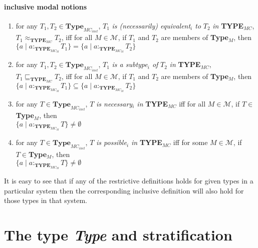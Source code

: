\paragraph{inclusive modal notions}
\begin{enumerate} 
 
\item for any $T_1,T_2\in\textbf{Type}_{\mathit{MC}_{\mathit{incl}}}$, $T_1$ \textit{is
    (necessarily) equivalent$_i$
    to} $T_2$ \textit{in} {\bf TYPE$_{\mathit{MC}}$},
  $T_1\approx_{\mathbf{TYPE_{\mathit{MC}}}}T_2$,  iff for all
  $M\in\mathcal{M}$, if $T_1$ and $T_2$ are members of
  \textbf{Type}$_M$, then $\{a\mid a:_{\mathbf{TYPE}_{\mathit{MC}_M}}T_1\}=\{a\mid a:_{\mathbf{TYPE}_{\mathit{MC}_M}}T_2\}$
  
 
\item for any $T_1,T_2\in\textbf{Type}_{\mathit{MC}_{\mathit{incl}}}$, $T_1$ \textit{is a subtype$_i$ of} $T_2$ \textit{in} {\bf TYPE$_{\mathit{MC}}$},
  $T_1\sqsubseteq_{\mathbf{TYPE_{\mathit{MC}}}}T_2$,  iff for all
  $M\in\mathcal{M}$, if $T_1$ and $T_2$ are members of
  \textbf{Type}$_M$, then $\{a\mid a:_{\mathbf{TYPE}_{\mathit{MC}_M}}T_1\}\subseteq\{a\mid a:_{\mathbf{TYPE}_{\mathit{MC}_M}}T_2\}$

\item for any $T\in\textbf{Type}_{\mathit{MC}_{\mathit{incl}}}$, $T$ \textit{is necessary$_i$ in} {\bf TYPE$_{\mathit{MC}}$}  iff for all
  $M\in\mathcal{M}$, if $T\in$\textbf{Type}$_M$, then \\ $\{a\mid a:_{\mathbf{TYPE}_{\mathit{MC}_M}}T\}\not=\emptyset$

\item for any $T\in\textbf{Type}_{\mathit{MC}_{\mathit{incl}}}$, $T$ \textit{is possible$_i$ in} {\bf TYPE$_{\mathit{MC}}$}  iff for some
  $M\in\mathcal{M}$, if $T\in$\textbf{Type}$_M$, then\\ $\{a\mid a:_{\mathbf{TYPE}_{\mathit{MC}_M}}T\}\not=\emptyset$
 
\end{enumerate}

It is easy to see that if any of the restrictive definitions holds for
given types in a particular system then the corresponding inclusive
definition will also hold for those types in that system.






\section{The type \textit{Type} and stratification}

